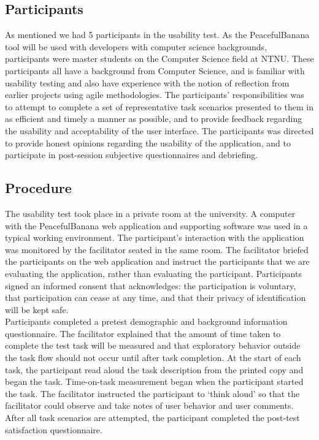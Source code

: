 \subsection{Participants}
As mentioned we had 5 participants in the usability test. As the PeacefulBanana tool will be used with developers with computer science backgrounds, participants were master students on the Computer Science field at NTNU. These participants all have a background from Computer Science, and is familiar with usability testing and also have experience with the notion of reflection from earlier projects using agile methodologies.
The participants' responsibilities was to attempt to complete a set of representative task scenarios presented to them in as efficient and timely a manner as possible, and to provide feedback regarding the usability and acceptability of the user interface. The participants was directed to provide honest opinions regarding the usability of the application, and to participate in post-session subjective questionnaires and debriefing.

\subsection{Procedure}
The usability test took place in a private room at the university. A computer with the PeacefulBanana web application and supporting software was used in a typical working environment. The participant’s interaction with the application was monitored by the facilitator seated in the same room.
The facilitator briefed the participants on the web application and instruct the participants that we are evaluating the application, rather than evaluating the participant. Participants signed an informed consent that acknowledges: the participation is voluntary, that participation can cease at any time, and that their privacy of identification will be kept safe. \\
Participants completed a pretest demographic and background information questionnaire. The facilitator explained that the amount of time taken to complete the test task will be measured and that exploratory behavior outside the task flow should not occur until after task completion. At the start of each task, the participant read aloud the task description from the printed copy and began the task. Time-on-task measurement began when the participant started the task.
The facilitator instructed the participant to ‘think aloud’ so that the facilitator could observe and take notes of user behavior and user comments.
After all task scenarios are attempted, the participant completed the post-test satisfaction questionnaire.

